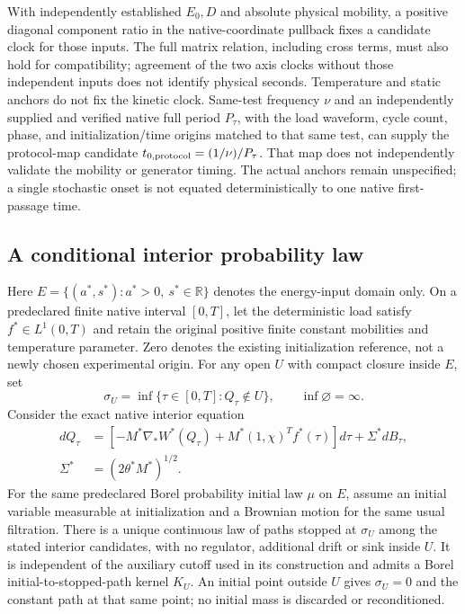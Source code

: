 \documentclass[11pt]{article}
\begin{document}
With independently established $E_0,D$ and absolute physical mobility,
a positive diagonal component ratio in the native-coordinate pullback
fixes a candidate clock for those inputs.
The full matrix relation, including cross terms, must also hold for compatibility;
agreement of the two axis clocks without those independent inputs
does not identify physical seconds.
Temperature and static anchors do not fix the kinetic clock.
Same-test frequency $\nu$ and an independently supplied and verified native
full period $P_\tau$, with the load waveform, cycle count, phase, and
initialization/time origins matched to that same test, can supply the
protocol-map candidate $t_{0,\rm protocol}=(1/\nu)/P_\tau$.
That map does not independently validate the mobility or generator timing.
The actual anchors remain unspecified; a single stochastic onset is
not equated deterministically to one native first-passage time.

\subsection{A conditional interior probability law}
Here $E=\{(a^*,s^*):a^*>0,\ s^*\in\mathbb R\}$ denotes the
energy-input domain only. On a predeclared finite native interval $[0,T]$,
let the deterministic load satisfy $f^*\in L^1(0,T)$ and retain the original
positive finite constant mobilities and temperature parameter.
Zero denotes the existing initialization reference, not a newly chosen
experimental origin. For any open $U$ with compact closure inside $E$, set
\begin{equation}
 \sigma_U=\inf\{\tau\in[0,T]:Q_\tau\notin U\},\qquad
 \inf\varnothing=\infty .
\end{equation}
Consider the exact native interior equation
\begin{equation}
\begin{aligned}
 dQ_\tau&=\left[-M^*\nabla_*W^*(Q_\tau)
       +M^*(1,\chi)^T f^*(\tau)\right]d\tau+\Sigma^*dB_\tau,\\
 \Sigma^*&=(2\theta^*M^*)^{1/2}.
\end{aligned}
\end{equation}
For the same predeclared Borel probability initial law $\mu$ on $E$,
assume an initial variable measurable at initialization and a Brownian
motion for the same usual filtration. There is a unique continuous law
of paths stopped at $\sigma_U$ among the stated interior candidates,
with no regulator, additional drift or sink inside $U$.
It is independent of the auxiliary cutoff used in its construction and
admits a Borel initial-to-stopped-path kernel $K_U$.
An initial point outside $U$ gives $\sigma_U=0$ and the constant path at
that same point; no initial mass is discarded or reconditioned.
\end{document}
